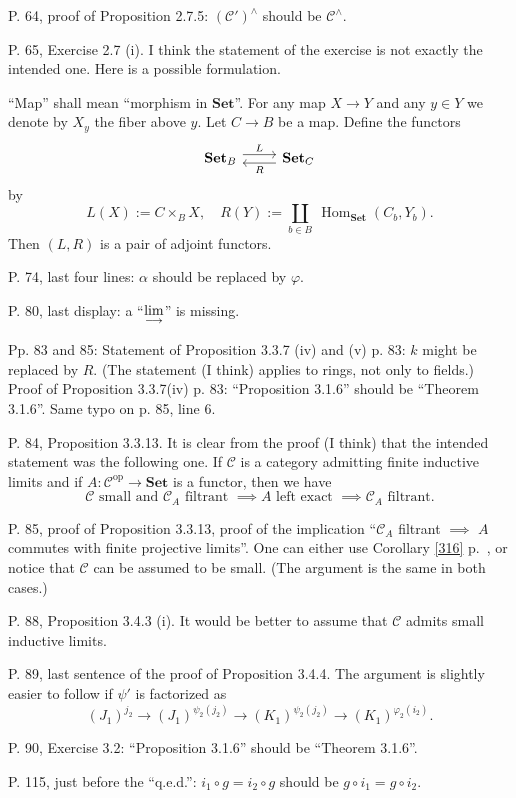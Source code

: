 \documentclass[12pt]{article}
\theoremstyle{remark}%
\newcommand{\n}{\noindent}
\newcommand{\C}{\mathcal C}
\newcommand{\Set}{\textbf{Set}}
\newcommand{\p}{\varphi}
\newcommand{\colim}{\operatornamewithlimits{\underset{\longrightarrow}{lim}}}
\DeclareMathOperator{\Hom}{Hom}
\DeclareMathOperator{\op}{op}
\begin{document}
\n P. 64, proof of Proposition 2.7.5: $(\C')^\wedge$ should be $\C^\wedge$. 

\n P. 65, Exercise 2.7 (i). I think the statement of the exercise is not exactly the intended one. Here is a possible formulation. 

``Map'' shall mean ``morphism in $\Set$''. For any map $X\to Y$ and any $y\in Y$ we denote by $X_y$ the fiber above $y$. Let $C\to B$ be a map. Define the functors 
$$
\begin{tikzcd}
\Set_B\ar[yshift=.7ex]{r}{L}&\Set_C\ar[yshift=-.7ex]{l}{R}
\end{tikzcd}
$$ 
by 
$$
L(X):=C\times_BX,\quad R(Y):=\coprod_{b\in B}\ \Hom_{\Set}(C_b,Y_b). 
$$ 
Then $(L,R)$ is a pair of adjoint functors. 

\n P. 74, last four lines: $\alpha$ should be replaced by $\varphi$. 

\n P. 80, last display: a ``$\displaystyle\colim$'' is missing.

\n Pp. 83 and 85: Statement of Proposition 3.3.7 (iv) and (v) p. 83: $k$ might be replaced by $R$. (The statement (I think) applies to rings, not only to fields.) Proof of Proposition 3.3.7(iv) p. 83: ``Proposition 3.1.6'' should be ``Theorem 3.1.6''. Same typo on p. 85, line 6. 

\n P. 84, Proposition 3.3.13. It is clear from the proof (I think) that the intended statement was the following one. If $\C$ is a category admitting finite inductive limits and if $A:\C^{\op}\to\Set$ is a functor, then we have 
$$
\C\text{ small and }\C_A\text{ filtrant }\implies A\text{ left exact }\implies\C_A\text{ filtrant}.
$$

\n P. 85, proof of Proposition 3.3.13, proof of the implication ``$\C_A$ filtrant $\implies$ $A$ commutes with finite projective limits''. One can either use Corollary \ref{316} p.~\pageref{316}, or notice that $\C$ can be assumed to be small. (The argument is the same in both cases.) 

\n P. 88, Proposition 3.4.3 (i). It would be better to assume that $\C$ admits small inductive limits. 

\n P. 89, last sentence of the proof of Proposition 3.4.4. The argument is slightly easier to follow if $\psi'$ is factorized as 
$$
(J_1)^{j_2}\to(J_1)^{\psi_2(j_2)}\to(K_1)^{\psi_2(j_2)}\to(K_1)^{\p_2(i_2)}.
$$ 

\n P. 90, Exercise 3.2: ``Proposition 3.1.6'' should be ``Theorem 3.1.6''.

\n P. 115, just before the ``q.e.d.'': $i_1\circ g=i_2\circ g$ should be $g\circ i_1=g\circ i_2$. 
\end{document}
